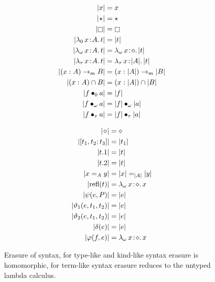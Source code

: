 

\begin{figure}
    \centering
    \begin{minipage}{0.5\textwidth}
        \begin{align*}
            |x| &= x \\
            |\!\star\!| &= \star \\
            |\kind| &= \kind \\
            |\abs{\lambda_0}{x}{A}{t}| &= |t| \\
            |\abs{\lambda_\omega}{x}{A}{t}| &= \abs{\lambda_\omega}{x}{\diamond}{|t|} \\
            |\abs{\lambda_\tau}{x}{A}{t}| &= \abs{\lambda_\tau}{x}{|A|}{|t|} \\
            |(x:A) \to_m B| &= (x:|A|) \to_m |B| \\
            |(x:A) \cap B| &= (x:|A|) \cap |B| \\
            |\app{f}{0}{a}| &= |f| \\
            |\app{f}{\omega}{a}| &= \app{|f|}{\omega}{|a|} \\
            |\app{f}{\tau}{a}| &= \app{|f|}{\tau}{|a|}
        \end{align*}
    \end{minipage}%
    \begin{minipage}{0.5\textwidth}
        \begin{align*}
            |\!\diamond\!| &= \diamond \\
            |[t_1, t_2; t_3]| &= |t_1| \\
            |t.1| &= |t| \\
            |t.2| &= |t| \\
            |x =_A y| &= |x| =_{|A|} |y| \\
            |\text{refl}(t)| &= {\lambda_\omega}\, x\! : \! \diamond.\, x \\
            |\psi(e, P)| &= |e| \\
            |\vartheta_1(e, t_1, t_2)| &= |e| \\
            |\vartheta_2(e, t_1, t_2)| &= |e| \\
            |\delta(e)| &= |e| \\
            |\varphi(f,e)| &= {\lambda_\omega}\, x\! : \! \diamond.\, x
        \end{align*}
    \end{minipage}
    \caption{Erasure of syntax, for type-like and kind-like syntax erasure is homomorphic, for term-like syntax erasure reduces to the untyped lambda calculus.}
    \label{fig:2:erasure}
\end{figure}
